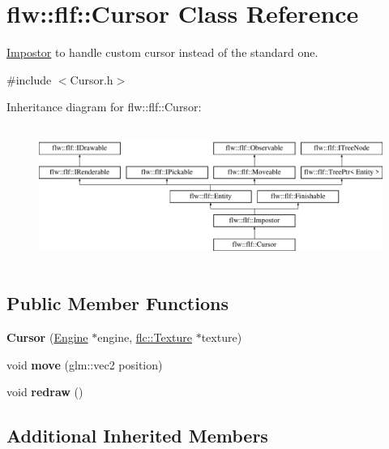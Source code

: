 \hypertarget{classflw_1_1flf_1_1Cursor}{}\section{flw\+:\+:flf\+:\+:Cursor Class Reference}
\label{classflw_1_1flf_1_1Cursor}


\hyperlink{classflw_1_1flf_1_1Impostor}{Impostor} to handle custom cursor instead of the standard one.  




{\ttfamily \#include $<$Cursor.\+h$>$}

Inheritance diagram for flw\+:\+:flf\+:\+:Cursor\+:\begin{figure}[H]
\begin{center}
\leavevmode
\includegraphics[height=4.487180cm]{classflw_1_1flf_1_1Cursor}
\end{center}
\end{figure}
\subsection*{Public Member Functions}
\begin{DoxyCompactItemize}
\item 
\mbox{\label{classflw_1_1flf_1_1Cursor_a339bd00cbcad4d867222ffedbbdce45e}} 
{\bfseries Cursor} (\hyperlink{classflw_1_1Engine}{Engine} $\ast$engine, \hyperlink{classflw_1_1flc_1_1Texture}{flc\+::\+Texture} $\ast$texture)
\item 
\mbox{\label{classflw_1_1flf_1_1Cursor_a444c7f22a58b7a0271e7a891d7472ff6}} 
void {\bfseries move} (glm\+::vec2 position)
\item 
\mbox{\label{classflw_1_1flf_1_1Cursor_a667a8922c7b91e186f7531eaef7be551}} 
void {\bfseries redraw} ()
\end{DoxyCompactItemize}
\subsection*{Additional Inherited Members}


